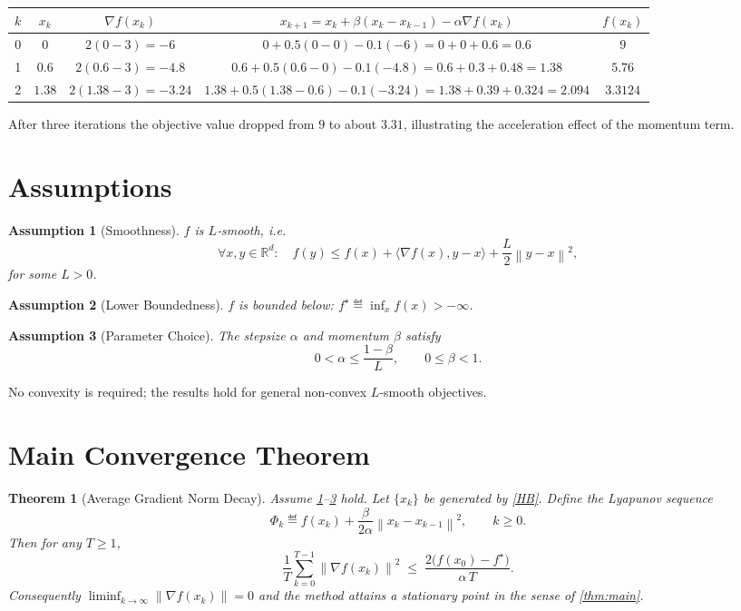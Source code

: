 \documentclass{article}
\newtheorem{theorem}{Theorem}
\newtheorem{assumption}{Assumption}
\newcommand{\R}{\mathbb{R}}
\newcommand{\norm}[1]{\left\lVert#1\right\rVert}
\begin{document}
\begin{center}
\begin{tabular}{c|c|c|c|c}
$k$ & $x_{k}$ & $\nabla f(x_{k})$ & $x_{k+1}=x_{k}+\beta(x_{k}-x_{k-1})-\alpha\nabla f(x_{k})$ & $f(x_{k})$\\\hline
0 & $0$ & $2(0-3)=-6$ & $0+0.5(0-0)-0.1(-6)=0+0+0.6=0.6$ & $9$\\
1 & $0.6$ & $2(0.6-3)=-4.8$ & $0.6+0.5(0.6-0)-0.1(-4.8)=0.6+0.3+0.48=1.38$ & $5.76$\\
2 & $1.38$ & $2(1.38-3)=-3.24$ & $1.38+0.5(1.38-0.6)-0.1(-3.24)=1.38+0.39+0.324=2.094$ & $3.3124$\\
\end{tabular}
\end{center}
After three iterations the objective value dropped from $9$ to about $3.31$, illustrating the acceleration effect of the momentum term.

\newpage
\section*{Assumptions}
\begin{assumption}[Smoothness]\label{ass:smooth}
$f$ is $L$‑smooth, i.e.
\[
\forall x,y\in\R^{d}:\quad 
f(y)\le f(x)+\langle\nabla f(x),y-x\rangle+\frac{L}{2}\norm{y-x}^{2},
\]
for some $L>0$.
\end{assumption}
\begin{assumption}[Lower Boundedness]\label{ass:lb}
$f$ is bounded below: $f^{\star}\eqdef\inf_{x}f(x)>-\infty$.
\end{assumption}
\begin{assumption}[Parameter Choice]\label{ass:params}
The stepsize $\alpha$ and momentum $\beta$ satisfy
\[
0<\alpha\le\frac{1-\beta}{L},\qquad 0\le\beta<1 .
\]
\end{assumption}

No convexity is required; the results hold for general non‑convex $L$‑smooth objectives.

\section*{Main Convergence Theorem}
\begin{theorem}[Average Gradient Norm Decay]\label{thm:main}
Assume \ref{ass:smooth}–\ref{ass:params} hold.  Let $\{x_{k}\}$ be generated by \eqref{HB}.  Define the Lyapunov sequence
\[
\Phi_{k}\eqdef f(x_{k})+\frac{\beta}{2\alpha}\norm{x_{k}-x_{k-1}}^{2},\qquad k\ge0 .
\]
Then for any $T\ge1$,
\begin{equation}
\frac{1}{T}\sum_{k=0}^{T-1}\norm{\nabla f(x_{k})}^{2}
\;\le\;
\frac{2\bigl(f(x_{0})-f^{\star}\bigr)}{\alpha\,T}. \tag{1}
\end{equation}
Consequently $\displaystyle\liminf_{k\to\infty}\norm{\nabla f(x_{k})}=0$ and the method attains a stationary point in the sense of \eqref{thm:main}.
\end{theorem}
\end{document}
